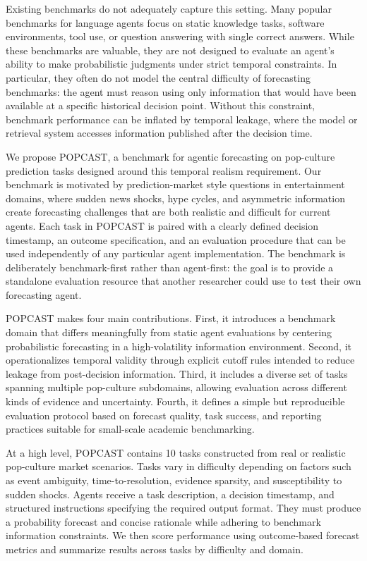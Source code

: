 \documentclass{article} %
\newcommand{\benchmarkname}{POPCAST}
\begin{document}
Existing benchmarks do not adequately capture this setting. Many popular benchmarks for language agents focus on static knowledge tasks, software environments, tool use, or question answering with single correct answers. While these benchmarks are valuable, they are not designed to evaluate an agent's ability to make probabilistic judgments under strict temporal constraints. In particular, they often do not model the central difficulty of forecasting benchmarks: the agent must reason using only information that would have been available at a specific historical decision point. Without this constraint, benchmark performance can be inflated by temporal leakage, where the model or retrieval system accesses information published after the decision time.

We propose \benchmarkname{}, a benchmark for agentic forecasting on pop-culture prediction tasks designed around this temporal realism requirement. Our benchmark is motivated by prediction-market style questions in entertainment domains, where sudden news shocks, hype cycles, and asymmetric information create forecasting challenges that are both realistic and difficult for current agents. Each task in \benchmarkname{} is paired with a clearly defined decision timestamp, an outcome specification, and an evaluation procedure that can be used independently of any particular agent implementation. The benchmark is deliberately benchmark-first rather than agent-first: the goal is to provide a standalone evaluation resource that another researcher could use to test their own forecasting agent.

\benchmarkname{} makes four main contributions. First, it introduces a benchmark domain that differs meaningfully from static agent evaluations by centering probabilistic forecasting in a high-volatility information environment. Second, it operationalizes temporal validity through explicit cutoff rules intended to reduce leakage from post-decision information. Third, it includes a diverse set of tasks spanning multiple pop-culture subdomains, allowing evaluation across different kinds of evidence and uncertainty. Fourth, it defines a simple but reproducible evaluation protocol based on forecast quality, task success, and reporting practices suitable for small-scale academic benchmarking.

At a high level, \benchmarkname{} contains 10 tasks constructed from real or realistic pop-culture market scenarios. Tasks vary in difficulty depending on factors such as event ambiguity, time-to-resolution, evidence sparsity, and susceptibility to sudden shocks. Agents receive a task description, a decision timestamp, and structured instructions specifying the required output format. They must produce a probability forecast and concise rationale while adhering to benchmark information constraints. We then score performance using outcome-based forecast metrics and summarize results across tasks by difficulty and domain.
\end{document}
